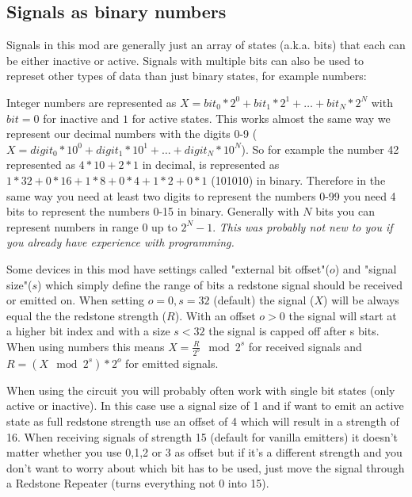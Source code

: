\documentclass[11pt]{article} %
\begin{document}
\subsection{Signals as binary numbers}
Signals in this mod are generally just an array of states (a.k.a. bits) that each can be either inactive or active. Signals with multiple bits can also be used to represet other types of data than just binary states, for example numbers:

Integer numbers are represented as $X = bit_0*2^0 + bit_1*2^1 + \dots + bit_N*2^N$ with $bit=0$ for inactive and $1$ for active states. This works almost the same way we represent our decimal numbers with the digits 0-9 ($X=digit_0*10^0 + digit_1*10^1 + \dots + digit_N*10^N$). So for example the number 42 represented as $4*10 + 2 * 1$ in decimal, is represented as $1*32 + 0*16 + 1*8 + 0*4 + 1*2 + 0*1$ (101010) in binary. Therefore in the same way you need at least two digits to represent the numbers 0-99 you need 4 bits to represent the numbers 0-15 in binary. Generally with $N$ bits you can represent numbers in range $0$ up to $2^N - 1$. \it This was probably not new to you if you already have experience with programming.\rm 

Some devices in this mod have settings called "external bit offset"($o$) and "signal size"($s$) which simply define the range of bits a redstone signal should be received or emitted on. When setting $o = 0, s = 32$ (default) the signal ($X$) will be always equal the the redstone strength ($R$). With an offset $o > 0$ the signal will start at a higher bit index and with a size $s < 32$ the signal is capped off after s bits. When using numbers this means $X= \frac{R}{2^o} \mod 2^s$ for received signals and $R = (X \mod 2^s) * 2^o$ for emitted signals.

When using the circuit you will probably often work with single bit states (only active or inactive). In this case use a signal size of 1 and if want to emit an active state as full redstone strength use an offset of 4 which will result in a strength of 16. When receiving signals of strength 15 (default for vanilla emitters) it doesn't matter whether you use 0,1,2 or 3 as offset but if it's a different strength and you don't want to worry about which bit has to be used, just move the signal through a Redstone Repeater (turns everything not 0 into 15).
\end{document}
